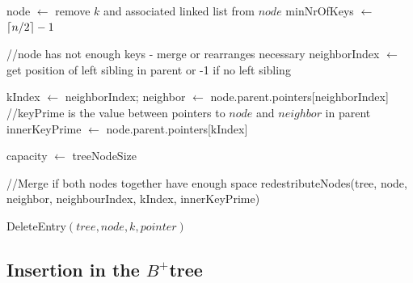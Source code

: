 \documentclass[abstracton,12pt,oneside]{scrreprt}
\DeclarePairedDelimiter\ceil{\lceil}{\rceil}
\begin{document}
\begin{algorithm}[H]
	\IncMargin{1em}
	\SetAlgoLined
	\DontPrintSemicolon


		node $\leftarrow$ remove $k$ and associated linked list from $node$\; 
		{
			minNrOfKeys $\leftarrow$ $\ceil{n/2}-1$\;
		}
			
		
		//node has not enough keys - merge or rearranges necessary\; 
		neighborIndex $\leftarrow$ get position of left sibling in parent or -1 if no left sibling\;
		
		{
			kIndex $\leftarrow$ neighborIndex; \;
			neighbor $\leftarrow$ node.parent.pointers[neighborIndex]\;
		}
		//keyPrime is the value between pointers to $node$ and $neighbor$ in parent\;
		innerKeyPrime $\leftarrow$ node.parent.pointers[kIndex]
		
		capacity $\leftarrow$ treeNodeSize\;	
	

		//Merge if both nodes together have enough space\;
		 {
		  	redestributeNodes(tree, node, neighbor, neighbourIndex, kIndex, innerKeyPrime)\;
		}   
	
	

	\caption{DeleteEntry$(tree, node, k, pointer)$}	\label{deleteEntry}
\end{algorithm}




\subsection{Insertion in the $B^+$tree}
\end{document}
